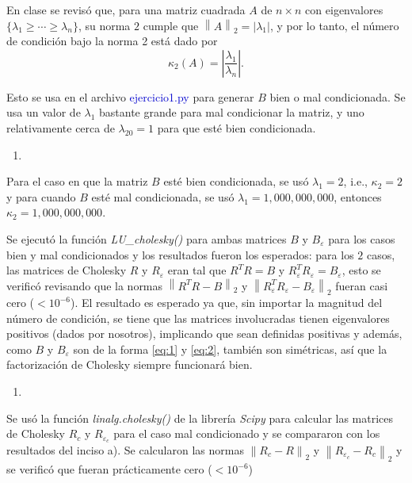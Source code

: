 En clase se revisó que, para una matriz cuadrada $A$ de $n\times n$ con eigenvalores $\{\lambda_1 \geq \cdots \geq \lambda_n\}$, su norma $2$ cumple que $\left\|A\right\|_2 = \left|\lambda_1\right|$, y por lo tanto, el número de condición bajo la norma 2 está dado por
\begin{equation} \label{eq:3}
	\kappa_{2} \left(A\right) = \left|\frac{\lambda_1}{\lambda_n}\right|.
\end{equation}

Esto se usa en el archivo \textcolor{mediumblue}{ejercicio1.py} para generar $B$ bien o mal condicionada. Se usa un valor de $\lambda_1$ bastante grande para mal condicionar la matriz, y uno relativamente cerca de $\lambda_{20}=1$ para que esté bien condicionada.

{\color{blue}
\begin{enumerate}[label=(\alph*), start=1]
	\item  
\end{enumerate}}
Para el caso en que la matriz $B$ esté bien condicionada, se usó $\lambda_1=2$, i.e., $\kappa_{2} = 2$ y para cuando $B$ esté mal condicionada, se usó $\lambda_1 = 1,000,000,000$, entonces $\kappa_{2} = 1,000,000,000$.

Se ejecutó la función \textit{LU\_cholesky()} para ambas matrices $B$ y $B_{\varepsilon}$ para los casos bien y mal condicionados y los resultados fueron los esperados: para los $2$ casos, las matrices de Cholesky $R$ y $R_{\varepsilon}$ eran tal que $R^{T}R = B$ y $R_{\varepsilon}^{T}R_{\varepsilon} = B_{\varepsilon}$, esto se verificó revisando que la normas $\left\|R^{T}R - B\right\|_2$ y $\left\|R_{\varepsilon}^{T}R_{\varepsilon} - B_{\varepsilon}\right\|_2$ fueran casi cero ($<10^{-6}$). El resultado es esperado ya que, sin importar la magnitud del número de condición, se tiene que las matrices involucradas tienen eigenvalores positivos (dados por nosotros), implicando que sean definidas positivas y además, como $B$ y $B_\varepsilon$ son de la forma \eqref{eq:1} y \eqref{eq:2}, también son simétricas, así que la factorización de Cholesky siempre funcionará bien.

{\color{blue}
	\begin{enumerate}[label=(\alph*), start=2]
		\item  
\end{enumerate}}
Se usó la función \textit{linalg.cholesky()} de la librería \textit{Scipy} para calcular las matrices de Cholesky $R_{c}$ y $R_{\varepsilon_{c}}$ para el caso mal condicionado y se compararon con los resultados del inciso a). Se calcularon las normas $\left\|R_c - R\right\|_2$ y $\left\| R_{\varepsilon_{c}} - R_c \right\|_2$ y se verificó que fueran prácticamente cero ($<10^{-6}$)

